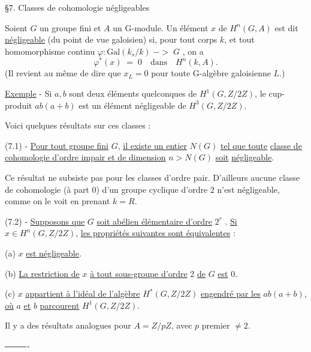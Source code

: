 
§7. Classes de cohomologie négligeables

Soient $G$ un groupe fini et $A$ un G-module. Un élément $x$ de
$H^{n}(G, A)$ est dit \uline{négligeable} (du point de vue galoisien) si, pour tout
corps $k$, et tout homomorphisme continu $\varphi : \mathrm{Gal}(k_{s}/k) \;{-}{>}\; G$ , on a
\[ \varphi^{*}(x) \;=\; 0 \quad \text{dans} \quad H^{n}(k, A). \]
(Il revient au même de dire que $x_{L} = 0$ pour toute G-algèbre galoisienne $L$.)

\uline{Exemple} - Si $a,b$ sont deux éléments quelconques de $H^{1}(G, Z/2Z)$, le
cup-produit $ab(a+b)$ est un élément négligeable de $H^{3}(G, Z/2Z)$.

Voici quelques résultats sur ces classes :

(7.1) - \uline{Pour tout groupe fini} $G$, \uline{il existe un entier} $N(G)$ \uline{tel que toute}
\uline{classe de cohomologie d'ordre impair et de dimension} $n > N(G)$ \uline{soit}
\uline{négligeable}.

Ce résultat ne subsiste pas pour les classes d'ordre pair. D'ailleurs
aucune classe de cohomologie (à part $0$) d'un groupe cyclique d'ordre $2$
n'est négligeable, comme on le voit en prenant $k = R$.

(7.2) - \uline{Supposons que} $G$ \uline{soit abélien élémentaire d'ordre} $2^{r}$ .
\uline{Si} $x \in H^{n}(G, Z/2Z)$, \uline{les propriétés suivantes sont équivalentes} :

(a) $x$ \uline{est négligeable}.

(b) \uline{La restriction de} $x$ \uline{à tout sous-groupe d'ordre} 2 \uline{de} $G$ \uline{est} $0$.

(c) $x$ \uline{appartient à l'idéal de l'algèbre} $H^{*}(G, Z/2Z)$ \uline{engendré par les}
$ab(a+b)$, \uline{où} $a$ \uline{et} $b$ \uline{parcourent} $H^{1}(G, Z/2Z)$.

Il y a des résultats analogues pour $A = Z/pZ$, avec $p$ premier $\neq 2$.

\begin{center}
\texttt{----------------}
\end{center}

